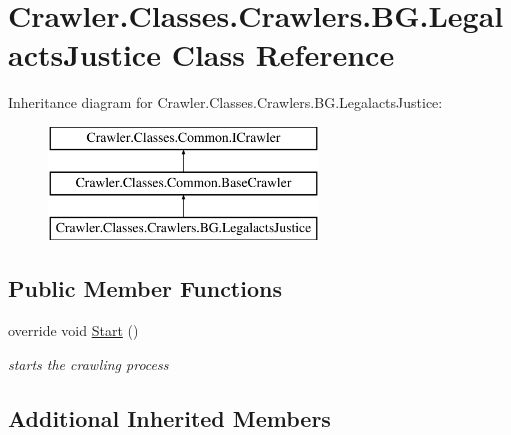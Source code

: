 \hypertarget{class_crawler_1_1_classes_1_1_crawlers_1_1_b_g_1_1_legalacts_justice}{\section{Crawler.\-Classes.\-Crawlers.\-B\-G.\-Legalacts\-Justice Class Reference}
\label{class_crawler_1_1_classes_1_1_crawlers_1_1_b_g_1_1_legalacts_justice}
}
Inheritance diagram for Crawler.\-Classes.\-Crawlers.\-B\-G.\-Legalacts\-Justice\-:\begin{figure}[H]
\begin{center}
\leavevmode
\includegraphics[height=3.000000cm]{class_crawler_1_1_classes_1_1_crawlers_1_1_b_g_1_1_legalacts_justice}
\end{center}
\end{figure}
\subsection*{Public Member Functions}
\begin{DoxyCompactItemize}
\item 
override void \hyperlink{class_crawler_1_1_classes_1_1_crawlers_1_1_b_g_1_1_legalacts_justice_a68a8a4170fda98eeba5db7672a44ff2c}{Start} ()
\begin{DoxyCompactList}\small\item\em starts the crawling process \end{DoxyCompactList}\end{DoxyCompactItemize}
\subsection*{Additional Inherited Members}


